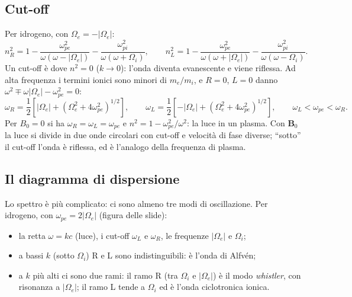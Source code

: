 \subsection{Cut-off}
Per idrogeno, con $\Omega_e=-|\Omega_e|$:
\begin{equation}
n_R^2=1-\frac{\omega_{pe}^2}{\omega(\omega-|\Omega_e|)}-\frac{\omega_{pi}^2}{\omega(\omega+\Omega_i)},\qquad n_L^2=1-\frac{\omega_{pe}^2}{\omega(\omega+|\Omega_e|)}-\frac{\omega_{pi}^2}{\omega(\omega-\Omega_i)} .
\end{equation}
Un cut-off è dove $n^2=0$ ($k\to0$): l'onda diventa evanescente e viene riflessa. Ad alta frequenza i termini ionici sono minori di $m_e/m_i$, e $R=0$, $L=0$ danno $\omega^2\mp\omega|\Omega_e|-\omega_{pe}^2=0$:
\begin{equation}
\omega_R=\frac12\left[|\Omega_e|+\left(\Omega_e^2+4\omega_{pe}^2\right)^{1/2}\right],\qquad\omega_L=\frac12\left[-|\Omega_e|+\left(\Omega_e^2+4\omega_{pe}^2\right)^{1/2}\right],\qquad\omega_L<\omega_{pe}<\omega_R .
\end{equation}
Per $B_0=0$ si ha $\omega_R=\omega_L=\omega_{pe}$ e $n^2=1-\omega_{pe}^2/\omega^2$: la luce in un plasma. Con $\mathbf{B}_0$ la luce si divide in due onde circolari con cut-off e velocità di fase diverse; ``sotto'' il cut-off l'onda è riflessa, ed è l'analogo della frequenza di plasma.

\subsection{Il diagramma di dispersione}
Lo spettro è più complicato: ci sono almeno tre modi di oscillazione. Per idrogeno, con $\omega_{pe}=2|\Omega_e|$ (figura delle slide):
\begin{itemize}
\item la retta $\omega=kc$ (luce), i cut-off $\omega_L$ e $\omega_R$, le frequenze $|\Omega_e|$ e $\Omega_i$;
\item a bassi $k$ (sotto $\Omega_i$) R e L sono indistinguibili: è l'onda di Alfv\'en;
\item a $k$ più alti ci sono due rami: il ramo R (tra $\Omega_i$ e $|\Omega_e|$) è il modo \emph{whistler}, con risonanza a $|\Omega_e|$; il ramo L tende a $\Omega_i$ ed è l'onda ciclotronica ionica.
\end{itemize}

